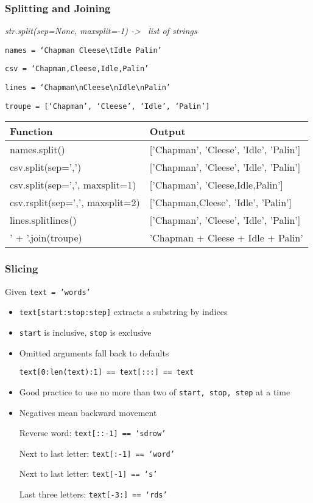 \documentclass{beamer}
\begin{document}
%
%
\begin{frame}
  \frametitle{Splitting and Joining}

  \textit{str.split(sep=None, maxsplit=-1) -\textgreater~ list of strings}

  \texttt{names = `Chapman Cleese\textbackslash tIdle      Palin'}

  \texttt{csv = `Chapman,Cleese,Idle,Palin'}

  \texttt{lines = `Chapman\textbackslash nCleese\textbackslash nIdle\textbackslash nPalin'}

  \texttt{troupe = [`Chapman', `Cleese', `Idle', `Palin']}
  
  \begin{table}
    \begin{tabular}{l | l}
    Function & Output \\
    \hline
    names.split() & ['Chapman', 'Cleese', 'Idle', 'Palin'] \\
    csv.split(sep=',') & ['Chapman', 'Cleese', 'Idle', 'Palin'] \\
    csv.split(sep=',', maxsplit=1) & ['Chapman', 'Cleese,Idle,Palin'] \\
    csv.rsplit(sep=',', maxsplit=2) & ['Chapman,Cleese', 'Idle', 'Palin'] \\
    lines.splitlines() & ['Chapman', 'Cleese', 'Idle', 'Palin'] \\
    \hline
    ' + '.join(troupe) & 'Chapman + Cleese + Idle + Palin'
    \end{tabular}
  \end{table}
\end{frame}


%
%
\begin{frame}
  \frametitle{Slicing}

  Given \texttt{text = 'words'}

  \begin{itemize}
    \item \texttt{text[start:stop:step]} extracts a substring by indices
    \item \texttt{start} is inclusive, \texttt{stop} is exclusive
    \item Omitted arguments fall back to defaults

      \texttt{text[0:len(text):1] == text[:::] == text}

    \item Good practice to use no more than two of \texttt{start, stop, step} at a time

    \item Negatives mean backward movement
    
      Reverse word: \texttt{text[::-1] == `sdrow'}

      Next to last letter: \texttt{text[:-1] == `word'}

      Next to last letter: \texttt{text[-1] == `s'}

      Last three letters: \texttt{text[-3:] == `rds'}
  \end{itemize}

\end{frame}
\end{document}
